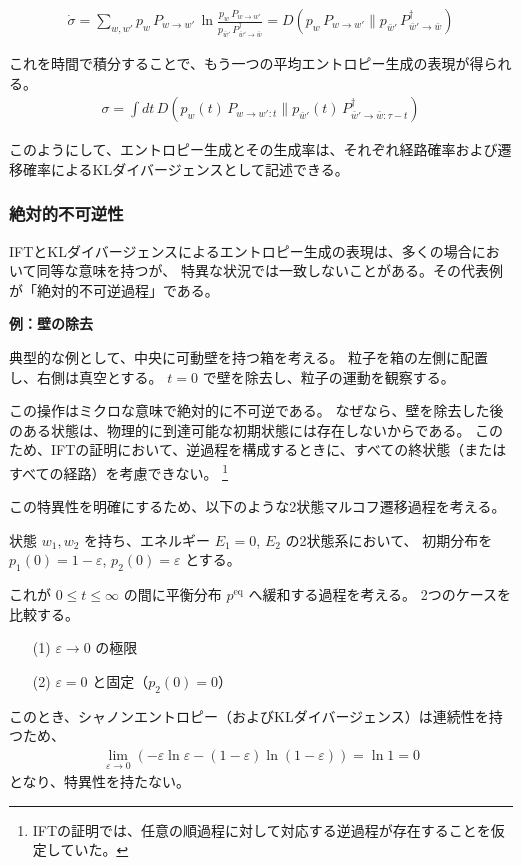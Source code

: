 \documentclass[a4paper,11pt]{jsarticle}
\numberwithin{equation}{section}
\begin{document}
\begin{align}
\dot{\sigma} 
= \sum_{w, w'} p_w\, P_{w \to w'}\, \ln \frac{p_w\, P_{w \to w'}}{p_{\bar{w}'}\, P^{\dagger}_{\bar{w}' \to \bar{w}}}
= D(p_w\, P_{w \to w'} \| p_{\bar{w}'}\, P^{\dagger}_{\bar{w}' \to \bar{w}})
\end{align}

これを時間で積分することで、もう一つの平均エントロピー生成の表現が得られる。
\begin{align}
\sigma = \int dt\, D(p_w(t)\, P_{w \to w':t} \| p_{\bar{w}'}(t)\, P^{\dagger}_{\bar{w}' \to \bar{w}: \tau -t})
\end{align}

このようにして、エントロピー生成とその生成率は、それぞれ経路確率および遷移確率によるKLダイバージェンスとして記述できる。

\subsubsection{絶対的不可逆性}

IFTとKLダイバージェンスによるエントロピー生成の表現は、多くの場合において同等な意味を持つが、
特異な状況では一致しないことがある。その代表例が「絶対的不可逆過程」である。

\textbf{例：壁の除去}

典型的な例として、中央に可動壁を持つ箱を考える。
粒子を箱の左側に配置し、右側は真空とする。
$t = 0$ で壁を除去し、粒子の運動を観察する。

この操作はミクロな意味で絶対的に不可逆である。
なぜなら、壁を除去した後のある状態は、物理的に到達可能な初期状態には存在しないからである。
このため、IFTの証明において、逆過程を構成するときに、すべての終状態（またはすべての経路）を考慮できない。
\footnote{IFTの証明では、任意の順過程に対して対応する逆過程が存在することを仮定していた。}


この特異性を明確にするため、以下のような2状態マルコフ遷移過程を考える。

状態 $w_1, w_2$ を持ち、エネルギー $E_1 = 0$, $E_2$ の2状態系において、
初期分布を $p_1(0) = 1 - \varepsilon$, $p_2(0) = \varepsilon$ とする。

これが $0 \leq t \leq \infty$ の間に平衡分布 $p^{\mathrm{eq}}$ へ緩和する過程を考える。
2つのケースを比較する。
\begin{itemize}
  \item[(1)] $\varepsilon \to 0$ の極限
  \item[(2)] $\varepsilon = 0$ と固定（$p_2(0) = 0$）
\end{itemize}
このとき、シャノンエントロピー（およびKLダイバージェンス）は連続性を持つため、
\begin{align}
\lim_{\varepsilon \to 0} \left( - \varepsilon \ln \varepsilon - (1 - \varepsilon) \ln (1 - \varepsilon) \right)
= \ln 1 = 0
\end{align}
となり、特異性を持たない。
\end{document}
